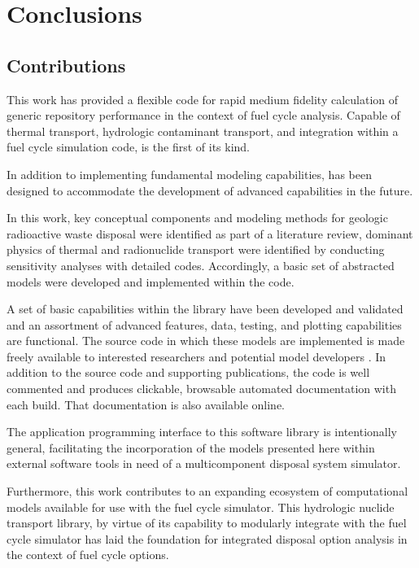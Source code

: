 \chapter{Conclusions}\label{ch:conclusion}
\section{Contributions}

This work has provided a flexible code for rapid medium fidelity calculation of 
generic repository performance in the context of fuel cycle analysis.  Capable 
of thermal transport, hydrologic contaminant transport, and integration 
within a fuel cycle simulation code, \Cyder is the first of its kind.  

In addition to implementing fundamental modeling capabilities, \Cyder has been 
designed to accommodate the development of advanced capabilities in the future.

In this work, key conceptual components and modeling methods for geologic 
radioactive waste disposal were identified as part of a literature review, 
dominant physics of thermal and radionuclide transport were identified by 
conducting sensitivity analyses with detailed codes. Accordingly, a basic set 
of abstracted models were developed and implemented within the \Cyder code. 

A set of basic capabilities within the \Cyder library have been developed and 
validated and an assortment of advanced features, data, testing, and plotting 
capabilities are functional.  The \Cyder source code in which these models are 
implemented  is made freely available to interested researchers and potential 
model developers \cite{huff_cyder_2013}. In addition to the source code and 
supporting publications, the \Cyder code is well commented and produces 
clickable, browsable automated documentation with each build. That 
documentation is also available online.

The application programming interface to this software library is intentionally 
general, facilitating the incorporation of the models presented here within 
external software tools in need of a multicomponent disposal system simulator. 

Furthermore, this work contributes to an expanding ecosystem of computational 
models available for use with the \Cyclus fuel cycle simulator. This hydrologic 
nuclide transport library, by virtue of its capability to modularly integrate 
with the \Cyclus fuel cycle simulator has laid the foundation for integrated 
disposal option analysis in the context of fuel cycle options. 

